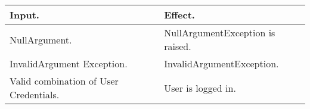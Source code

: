 \begin{flushleft}
\begin{tabular}{| p{} |p{}|}
			\textbf{Input}.		&		\textbf{Effect}.\\
			\hline
			
			NullArgument.		&		NullArgumentException is raised.\\
			\hline
			
			InvalidArgument Exception.		&		InvalidArgumentException.\\
			\hline
		
			Valid combination of User Credentials.		&		User is logged in.\\
			\hline
			\hline
		\end{tabular}

	\end{flushleft}